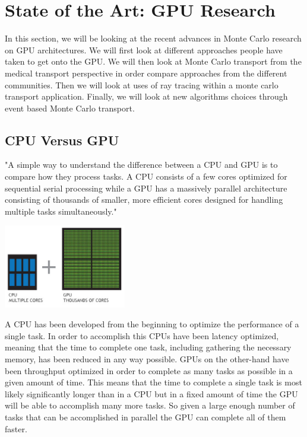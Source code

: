 \section{ \textbf{State of the Art: GPU Research} }
\label{sec:SOTAGPU}

In this section, we will be looking at the recent advances in Monte Carlo research on GPU architectures.
%
We will first look at different approaches people have taken to get onto the GPU.
%
We will then look at Monte Carlo transport from the medical transport perspective in order compare approaches from the different communities.
%
Then we will look at uses of ray tracing within a monte carlo transport application.
%
Finally, we will look at new algorithms choices through event based Monte Carlo transport.
%

%
\subsection{\textbf{ CPU Versus GPU} }

"A simple way to understand the difference between a CPU and GPU is to compare how they process tasks. A CPU consists of a few cores optimized for sequential serial processing while a GPU has a massively parallel architecture consisting of thousands of smaller, more efficient cores designed for handling multiple tasks simultaneously."~\cite{CPUvGPUnvidia}

\includegraphics[width=0.4\textwidth]{cpu-and-gpu.jpg}~\cite{CPUvGPUnvidia}

A CPU has been developed from the beginning to optimize the performance of a single task. 
%
In order to accomplish this CPUs have been latency optimized, meaning that the time to complete one task, including gathering the necessary memory, has been reduced in any way possible.
%
GPUs on the other-hand have been throughput optimized in order to complete as many tasks as possible in a given amount of time.
%
This means that the time to complete a single task is most likely significantly longer than in a CPU but in a fixed amount of time the GPU will be able to accomplish many more tasks.
%
So given a large enough number of tasks that can be accomplished in parallel the GPU can complete all of them faster.


